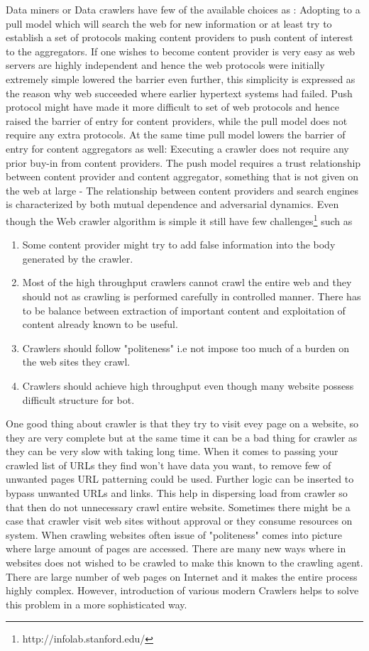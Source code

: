 \documentclass[article,type=msc,colorback,accentcolor=tud9c,twoside,11pt]{tudthesis}
\begin{document}
Data miners or Data crawlers have few of the available choices as : Adopting to a pull model which will search the web for new information or at least try to establish a set of protocols making content providers to push content of interest to the aggregators. If one wishes to become content provider is very easy as web servers are highly independent and hence the web protocols were initially extremely simple lowered the barrier even further, this simplicity is expressed as the reason why web succeeded where earlier hypertext systems had failed. Push protocol might have made it more difficult to set of web protocols and hence raised the barrier of entry for content providers, while the pull model does not require any extra protocols. At the same time pull model lowers the barrier of entry for content aggregators as well: Executing a crawler does not require any prior buy-in from content providers. The push model requires a trust relationship between content provider and content aggregator, something that is not given on the web at large - The relationship between content providers and search engines is characterized by both mutual dependence and adversarial dynamics.
Even though the Web crawler algorithm is simple it still have few challenges\footnote{http://infolab.stanford.edu/} such as
\begin{enumerate}
\item Some content provider might try to add false information into the body generated by the crawler.
\item Most of the high throughput crawlers cannot crawl the entire web and they should not as crawling is performed carefully in controlled manner. There has to be balance between extraction of important content and exploitation of content already known to be useful.
\item Crawlers should follow "politeness" i.e not impose too much of a burden on the web sites they crawl.
\item Crawlers should achieve high throughput even though many website possess difficult structure for bot.
\end{enumerate}

One good thing about crawler is that they try to visit evey page on a website, so they are very complete but at the same time it can be a bad thing for crawler as they can be very slow with taking long time. When it comes to passing your crawled list of URLs they find won't have data you want, to remove few of unwanted pages URL patterning could be used. Further logic can be inserted to bypass unwanted URLs and links. This help in dispersing load from crawler so that then do not unnecessary crawl entire website. Sometimes there might be a case that crawler visit web sites without approval or they consume resources on system. When crawling websites often issue of "politeness" comes into picture where large amount of pages are accessed. There are many new ways where in websites does not wished to be crawled to make this known to the crawling agent. There are large number of web pages on Internet and it makes the entire process highly complex. However, introduction of various modern Crawlers helps to solve this problem in a more sophisticated way. 
\end{document}

